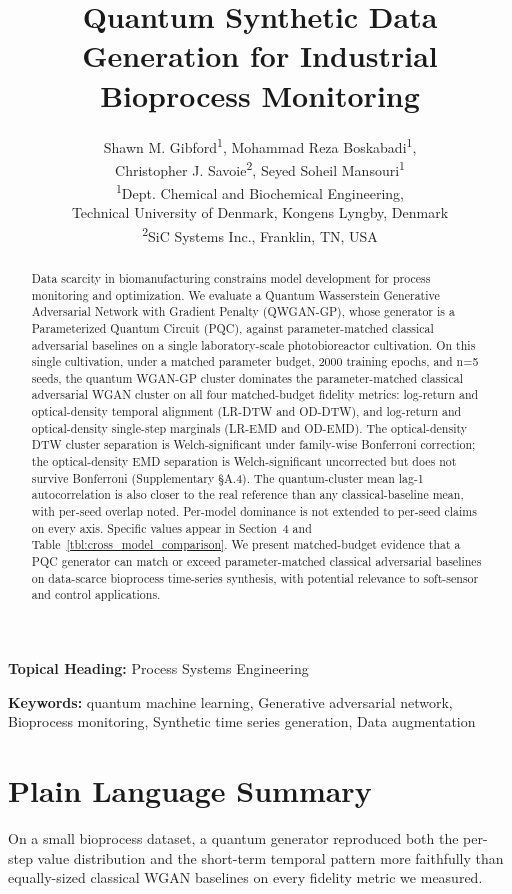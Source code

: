 \documentclass[12pt,twocolumn]{article}
\title{Quantum Synthetic Data Generation for Industrial Bioprocess Monitoring}
\author{
Shawn M. Gibford\textsuperscript{1}, Mohammad Reza Boskabadi\textsuperscript{1},\\ Christopher J. Savoie\textsuperscript{2}, Seyed Soheil Mansouri\textsuperscript{1}\\
\textsuperscript{1}Dept. Chemical and Biochemical Engineering, \\
Technical University of Denmark,
Kongens Lyngby, Denmark\\
\textsuperscript{2}SiC Systems Inc., Franklin, TN, USA
}
\date{} %
\begin{document}
\maketitle
\begin{abstract}
\noindent
Data scarcity in biomanufacturing constrains model development for process monitoring and optimization. We evaluate a Quantum Wasserstein Generative Adversarial Network with Gradient Penalty (QWGAN-GP), whose generator is a Parameterized Quantum Circuit (PQC), against parameter-matched classical adversarial baselines on a single laboratory-scale photobioreactor cultivation. On this single cultivation, under a matched parameter budget, 2000 training epochs, and n=5 seeds, the quantum WGAN-GP cluster dominates the parameter-matched classical adversarial WGAN cluster on all four matched-budget fidelity metrics: log-return and optical-density temporal alignment (LR-DTW and OD-DTW), and log-return and optical-density single-step marginals (LR-EMD and OD-EMD). The optical-density DTW cluster separation is Welch-significant under family-wise Bonferroni correction; the optical-density EMD separation is Welch-significant uncorrected but does not survive Bonferroni (Supplementary \S A.4). The quantum-cluster mean lag-1 autocorrelation is also closer to the real reference than any classical-baseline mean, with per-seed overlap noted. Per-model dominance is not extended to per-seed claims on every axis. Specific values appear in Section~4 and Table~\ref{tbl:cross_model_comparison}. We present matched-budget evidence that a PQC generator can match or exceed parameter-matched classical adversarial baselines on data-scarce bioprocess time-series synthesis, with potential relevance to soft-sensor and control applications.
\end{abstract}

\noindent\textbf{Topical Heading:} Process Systems Engineering

\noindent\textbf{Keywords:} quantum machine learning, Generative adversarial network, Bioprocess monitoring, Synthetic time series generation, Data augmentation

\section*{Plain Language Summary}
On a small bioprocess dataset, a quantum generator reproduced both the per-step value distribution and the short-term temporal pattern more faithfully than equally-sized classical WGAN baselines on every fidelity metric we measured.
\end{document}
